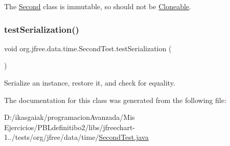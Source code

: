 The \mbox{\hyperlink{classorg_1_1jfree_1_1data_1_1time_1_1_second}{Second}} class is immutable, so should not be \mbox{\hyperlink{}{Cloneable}}. \mbox{\label{classorg_1_1jfree_1_1data_1_1time_1_1_second_test_af0cbe63df586a79fb6692b72b68aeba5}} 
\subsubsection{\texorpdfstring{test\+Serialization()}{testSerialization()}}
{\footnotesize\ttfamily void org.\+jfree.\+data.\+time.\+Second\+Test.\+test\+Serialization (\begin{DoxyParamCaption}{ }\end{DoxyParamCaption})}

Serialize an instance, restore it, and check for equality. 

The documentation for this class was generated from the following file\+:\begin{DoxyCompactItemize}
\item 
D\+:/ikasgaiak/programacion\+Avanzada/\+Mis Ejercicios/\+P\+B\+Ldefinitibo2/libs/jfreechart-\/1../tests/org/jfree/data/time/\mbox{\hyperlink{_second_test_8java}{Second\+Test.\+java}}\end{DoxyCompactItemize}
